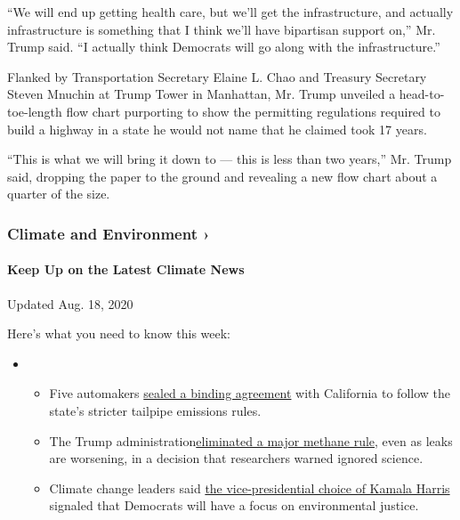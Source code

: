 ``We will end up getting health care, but we'll get the infrastructure,
and actually infrastructure is something that I think we'll have
bipartisan support on,'' Mr. Trump said. ``I actually think Democrats
will go along with the infrastructure.''

Flanked by Transportation Secretary Elaine L. Chao and Treasury
Secretary Steven Mnuchin at Trump Tower in Manhattan, Mr. Trump unveiled
a head-to-toe-length flow chart purporting to show the permitting
regulations required to build a highway in a state he would not name
that he claimed took 17 years.

``This is what we will bring it down to --- this is less than two
years,'' Mr. Trump said, dropping the paper to the ground and revealing
a new flow chart about a quarter of the size.

\href{https://www.nytimes3xbfgragh.onion/section/climate?action=click\&pgtype=Article\&state=default\&region=MAIN_CONTENT_1\&context=storylines_keepup}{}

\hypertarget{climate-and-environment-}{%
\subsubsection{Climate and Environment
›}\label{climate-and-environment-}}

\hypertarget{keep-up-on-the-latest-climate-news}{%
\paragraph{Keep Up on the Latest Climate
News}\label{keep-up-on-the-latest-climate-news}}

Updated Aug. 18, 2020

Here's what you need to know this week:

\begin{itemize}
\item
  \begin{itemize}
  \tightlist
  \item
    Five automakers
    \href{https://www.nytimes3xbfgragh.onion/2020/08/17/climate/california-automakers-pollution.html?action=click\&pgtype=Article\&state=default\&region=MAIN_CONTENT_1\&context=storylines_keepup}{sealed
    a binding agreement} with California to follow the state's stricter
    tailpipe emissions rules.
  \item
    The Trump
    administration\href{https://www.nytimes3xbfgragh.onion/2020/08/13/climate/trump-methane.html?action=click\&pgtype=Article\&state=default\&region=MAIN_CONTENT_1\&context=storylines_keepup}{eliminated
    a major methane rule}, even as leaks are worsening, in a decision
    that researchers warned ignored science.
  \item
    Climate change leaders said
    \href{https://www.nytimes3xbfgragh.onion/2020/08/12/climate/kamala-harris-environmental-justice.html?action=click\&pgtype=Article\&state=default\&region=MAIN_CONTENT_1\&context=storylines_keepup}{the
    vice-presidential choice of Kamala Harris} signaled that Democrats
    will have a focus on environmental justice.
  \end{itemize}
\end{itemize}

